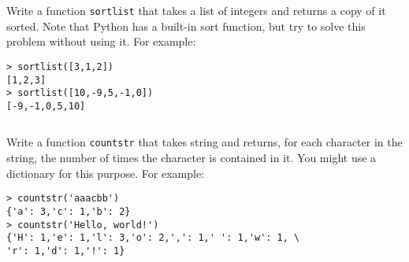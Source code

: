 \documentclass{iansproblems}
\begin{document}
\begin{questions}
\question
Write a function \texttt{sortlist} that takes a list of integers and returns a copy of it sorted.
Note that Python has a built-in sort function, but try to solve this problem without using it.
For example:
\begin{verbatim}
> sortlist([3,1,2])
[1,2,3]
> sortlist([10,-9,5,-1,0])
[-9,-1,0,5,10]
\end{verbatim}

\begin{solution}
  \inputminted{python}{solutions/sortlist.py}
\end{solution}


\question
Write a function \texttt{countstr} that takes string and returns, for each character in the string, the number of times the character is contained in it.
You might use a dictionary for this purpose.
For example:
\begin{verbatim}
> countstr('aaacbb')
{'a': 3,'c': 1,'b': 2}
> countstr('Hello, world!')
{'H': 1,'e': 1,'l': 3,'o': 2,',': 1,' ': 1,'w': 1, \
'r': 1,'d': 1,'!': 1}
\end{verbatim}

\begin{solution}
  \inputminted{python}{solutions/countstr.py}
\end{solution}


\end{questions}
\end{document}
